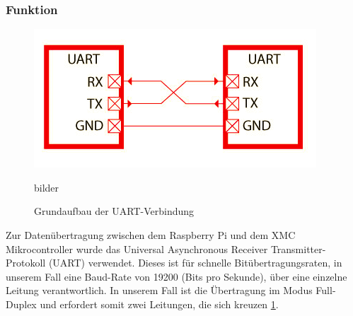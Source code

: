 \documentclass[12pt,a4paper,bibliography=totoc,listof=totoc]{scrartcl}
\begin{document}
\subsubsection{Funktion}
\begin{figure}[htbp]
	\centering
	\includegraphics[scale = 0.6]{pics/BildUart1}
	\caption{Grundaufbau der UART-Verbindung}bilder 
	\label{UART}
\end{figure}
Zur Datenübertragung zwischen dem Raspberry Pi und dem XMC Mikrocontroller wurde das Universal 
Asynchronous Receiver Transmitter-Protokoll (UART) verwendet. Dieses ist für schnelle Bitübertragungsraten, 
in unserem Fall eine Baud-Rate von 19200 (Bits pro Sekunde), über eine einzelne Leitung verantwortlich. 
In unserem Fall ist die Übertragung im Modus Full-Duplex und erfordert somit zwei Leitungen, die sich 
kreuzen \ref{UART}.
\end{document}
